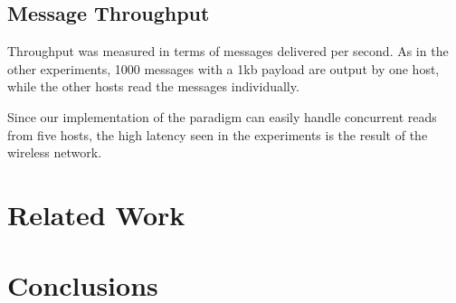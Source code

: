\documentclass[lnicst]{svmultln}
\begin{document}
\subsection{Message Throughput}

Throughput was measured in terms of messages delivered per second. As in the other experiments, 1000 messages with a 1kb payload are output by one host, while the other hosts read the messages individually.

Since our implementation of the paradigm can easily handle concurrent reads from five hosts, the high latency seen in the experiments is the result of the wireless network.

\section{Related Work}


\section{Conclusions}




\end{document}
